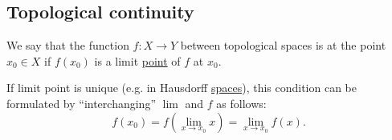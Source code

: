 \subsection{Topological continuity}\label{subsec:topological_continuity}

\begin{Definition}\label{def:local_continuity}
  We say that the function \( f: X \to Y \) between topological spaces is  at the point \( x_0 \in X \) if \( f(x_0) \) is a limit \hyperref[def:local_convergence]{point} of \( f \) at \( x_0 \).

  If limit point is unique (e.g. in Hausdorff \hyperref[thm:t2_iff_singleton_limits]{spaces}), this condition can be formulated by \enquote{interchanging} \( \lim \) and \( f \) as follows:
  \begin{equation*}
    f(x_0) = f\left( \lim_{x \to x_0} x \right) = \lim_{x \to x_0} f(x).
  \end{equation*}
\end{Definition}

